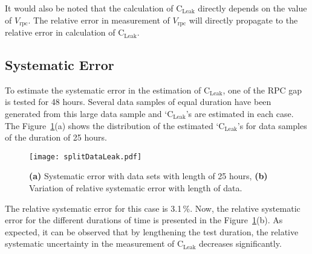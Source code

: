 It would also be noted that the calculation of $\textrm{C}_{\textrm{Leak}}$ directly depends on the value of $V_{\textrm{rpc}}$. The relative error in measurement of $V_{\textrm{rpc}}$ will directly propagate to the relative error in calculation of $\textrm{C}_{\textrm{Leak}}$.

\subsection{Systematic Error}
To estimate the systematic error in the estimation of $\textrm{C}_{\textrm{Leak}}$, one of the RPC gap is tested for 48 hours. Several data samples of equal duration have been generated from this large data sample and `$\textrm{C}_{\textrm{Leak}}$'s are estimated in each case. The Figure~\ref{fig:systematic}(a) shows the distribution of the estimated `$\textrm{C}_{\textrm{Leak}}$'s for data samples of the duration of 25 hours.
\begin{figure}
  \centering
  \texttt{[image: splitDataLeak.pdf]}
  \caption{\textbf{(a)} Systematic error with data sets with length of 25 hours, \textbf{(b)} Variation of relative systematic error with length of data.}
  \label{fig:systematic}
\end{figure}
The relative systematic error for this case is 3.1\,\%. Now, the relative systematic error for the different durations of time is presented in the Figure~\ref{fig:systematic}(b). As expected, it can be observed that by lengthening the test duration, the relative systematic uncertainty in the measurement of $\textrm{C}_{\textrm{Leak}}$ decreases significantly.

